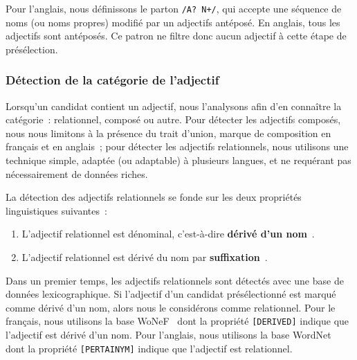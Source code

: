         Pour l'anglais, nous définissons le parton \texttt{/A? N+/}, qui
        accepte une séquence de noms (ou noms propres) modifié par un adjectifs
        antéposé. En anglais, tous les adjectifs sont antéposés. Ce patron ne
        filtre donc aucun adjectif à cette étape de présélection.

      \subsubsection{Détection de la catégorie de l'adjectif}
      \label{subsubsec:main-automatic_keyphrase_annotation-keyphrase_candidate_selection-modifiers_filtering-relational_adjective_detection}
        Lorsqu'un candidat contient un adjectif, nous l'analysons afin d'en
        connaître la catégorie~: relationnel, composé ou autre. Pour détecter les
        adjectifs composés, nous nous limitons à la présence du trait d'union,
        marque de composition en français et en anglais~; pour détecter les
        adjectifs relationnels, nous utilisons une technique simple, adaptée (ou
        adaptable) à plusieurs langues, et ne requérant pas nécessairement de
        données riches.

        La détection des adjectifs relationnels se fonde sur les deux propriétés
        linguistiques suivantes~:
        \begin{enumerate}
          \item{L'adjectif relationnel est dénominal, c'est-à-dire
                \textbf{dérivé d'un
                nom}~\cite{bally1944linguistiquegeneraleetlinguistiquefrancaise}.}
          \item{L'adjectif relationnel est dérivé du nom par
                \textbf{suffixation}~\cite{dubois1999derivation}.}
        \end{enumerate}

        Dans un premier temps, les adjectifs relationnels sont détectés avec une
        base de données lexicographique. Si l'adjectif d'un candidat
        présélectionné est marqué comme dérivé d'un nom, alors nous le
        considérons comme relationnel. Pour le français, nous utilisons la base
        WoNeF~\cite{pradet2013wonef} dont la propriété \texttt{[DERIVED]}
        indique que l'adjectif est dérivé d'un nom. Pour l'anglais, nous
        utilisons la base  WordNet~\cite{miller1995wordnet} dont la propriété
        \texttt{[PERTAINYM]} indique que l'adjectif est relationnel.

